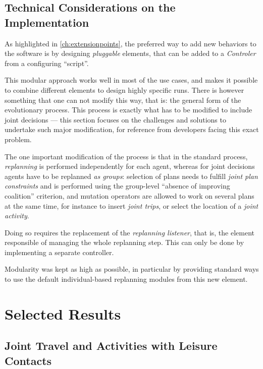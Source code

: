 {\subsection{Technical Considerations on the Implementation}
As highlighted in \cref{ch:extensionpoints},
the preferred way to add new behaviors to the \matsim software is
by designing \emph{pluggable} elements,
that can be added to a \emph{Controler} from a configuring ``script''.

This modular approach works well in most of the use cases,
and makes it possible to combine different elements to design highly
specific runs.
There is however something that one can not modify this way,
that is: the general form of the evolutionary process.
This process is exactly what has to be modified to include joint decisions
--- 
this section focuses on the challenges and solutions to undertake such major
modification, for reference from developers facing this exact problem.

The one important modification of the process is that in the standard \matsim process,
\emph{replanning} is performed independently for each agent,
whereas for joint decisions agents have to be replanned \emph{as groups}:
selection of plans needs to fulfill \emph{joint plan constraints}
and is performed using the group-level ``absence of improving coalition''
criterion, and mutation operators are allowed to work on several plans at the same time,
for instance to insert \emph{joint trips}, or select the location of a
\emph{joint activity}.

Doing so requires the replacement of the \emph{replanning listener},
that is, the element responsible of managing the whole replanning step.
This can only be done by implementing a separate controller.

Modularity was kept as high as possible, in particular by providing standard ways
to use the default individual-based replanning modules from this new element.

\section{Selected Results\label{sec:td:results}}
\subsection{Joint Travel and Activities with Leisure Contacts}

}
